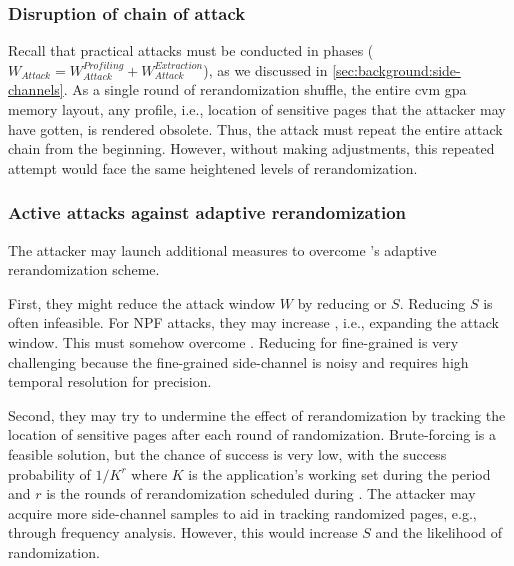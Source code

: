 	\subsubsection{Disruption of chain of attack}
	Recall that practical attacks must be conducted in phases ($W_{Attack} = W_{Attack}^{Profiling} + W_{Attack}^{Extraction}$), as we discussed in \cref{sec:background:side-channels}.
	As a single round of rerandomization shuffle, the entire \gls{cvm} \gls{gpa} memory layout, any profile, i.e., location of sensitive pages that the attacker may have gotten, is rendered obsolete.
	Thus, the attack must repeat the entire attack chain from the beginning.
	However, without making adjustments, this repeated attempt would face the same heightened levels of rerandomization.

	\subsubsection{Active attacks against adaptive rerandomization}
	The attacker may launch additional measures to overcome \thename's adaptive rerandomization scheme.

	First, they might reduce the attack window $W$ by reducing \periodvmexit or $S$.
	Reducing $S$ is often infeasible.
	For NPF attacks, they may increase \periodvmexit, i.e., expanding the attack window.
	This must somehow overcome .
	Reducing \periodvmexit for fine-grained is very challenging because the fine-grained side-channel is noisy and requires high temporal resolution for precision.

	Second, they may try to undermine the effect of rerandomization by tracking the location of sensitive pages after each round of randomization.
	Brute-forcing is a feasible solution, but the chance of success is very low, with the success probability of $1/K^r$ where $K$ is the application's working set during the period and $r$ is the rounds of rerandomization scheduled during \attwindow.
	The attacker may acquire more side-channel samples to aid in tracking randomized pages, e.g., through frequency analysis. However, this would increase $S$ and the likelihood of randomization.






